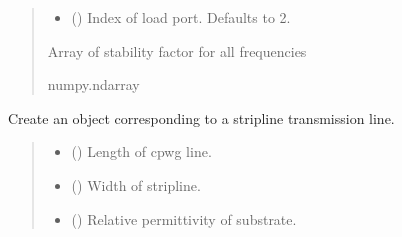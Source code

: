 \documentclass[letterpaper,10pt,english]{sphinxmanual}
\begin{document}
\begin{fulllineitems}
\begin{fulllineitems}
\begin{quote}
\begin{description}
\begin{itemize}
\item {} 
\sphinxAtStartPar
{} (\sphinxstyleliteralemphasis{\sphinxupquote{, }}) \textendash{} Index of load port. Defaults to 2.

\end{itemize}

\sphinxAtStartPar
Array of stability factor for all frequencies

\sphinxAtStartPar
numpy.ndarray

\end{description}\end{quote}

\end{fulllineitems}


\begin{fulllineitems}
\label{\detokenize{touchstone:touchstone.spfile.stripline}}
\pysigstartsignatures
{}
\pysigstopsignatures
\sphinxAtStartPar
Create an  object corresponding to a stripline transmission line.
\begin{quote}\begin{description}
\begin{itemize}
\item {} 
\sphinxAtStartPar
{} () \textendash{} Length of cpwg line.

\item {} 
\sphinxAtStartPar
{} () \textendash{} Width of stripline.

\item {} 
\sphinxAtStartPar
{} () \textendash{} Relative permittivity of substrate.


\end{itemize}
\end{description}
\end{quote}
\end{fulllineitems}
\end{fulllineitems}
\end{document}
